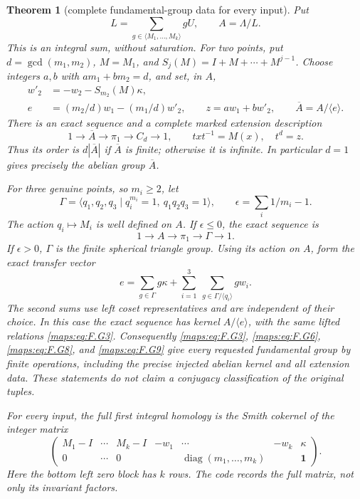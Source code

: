 \documentclass[11pt,a4paper]{article}
\newtheorem{theorem}{Theorem}[section]
\theoremstyle{definition}
\begin{document}
\begin{theorem}[complete fundamental-group data for every input]
Put
\[
 L=\sum_{g\in\langle M_1,\ldots,M_k\rangle}gU,
 \qquad A=\Lambda/L.                                      \tag{F.G4}\label{maps:eq:F.G4}
\]
This is an integral sum, without saturation.  For two points, put
$d=\gcd(m_1,m_2)$, $M=M_1$, and
$S_j(M)=I+M+\cdots+M^{j-1}$.  Choose integers $a,b$ with
$am_1+bm_2=d$, and set, in $A$,
\[
 \begin{split}
 w'_2&=-w_2-S_{m_2}(M)\kappa,\\
 e&=(m_2/d)w_1-(m_1/d)w'_2,\qquad
 z=aw_1+bw'_2,\qquad \overline A=A/\langle e\rangle .
 \end{split}                                             \tag{F.G5}\label{maps:eq:F.G5}
\]
There is an exact sequence and a complete marked extension description
\[
 1\longrightarrow\overline A\longrightarrow\pi_1
   \longrightarrow C_d\longrightarrow1,
 \qquad txt^{-1}=M(x),\quad t^d=z.                         \tag{F.G6}\label{maps:eq:F.G6}
\]
Thus its order is $d|\overline A|$ if $\overline A$ is finite;
otherwise it is infinite.  In particular $d=1$ gives precisely
the abelian group $\overline A$.

For three genuine points, so $m_i\ge2$, let
\[
 \Gamma=\langle q_1,q_2,q_3\mid q_i^{m_i}=1,
                         \ q_1q_2q_3=1\rangle,
 \qquad \epsilon=\sum_i1/m_i-1.                           \tag{F.G7}\label{maps:eq:F.G7}
\]
The action $q_i\mapsto M_i$ is well defined on $A$.
If $\epsilon\le0$, the exact sequence is
\[
                    1\longrightarrow A\longrightarrow\pi_1
                         \longrightarrow\Gamma\longrightarrow1. 
 \tag{F.G8}\label{maps:eq:F.G8}
\]
If $\epsilon>0$, $\Gamma$ is the finite spherical triangle group.
Using its action on $A$, form the exact transfer vector
\[
 e=\sum_{g\in\Gamma}g\kappa+
       \sum_{i=1}^3\ \sum_{g\in\Gamma/\langle q_i\rangle}g w_i.
 \tag{F.G9}\label{maps:eq:F.G9}
\]
The second sums use left coset representatives and are independent
of their choice.  In this case the exact sequence has kernel
$A/\langle e\rangle$, with the same lifted relations \eqref{maps:eq:F.G3}.
Consequently \eqref{maps:eq:F.G3}, \eqref{maps:eq:F.G6}, \eqref{maps:eq:F.G8}, and \eqref{maps:eq:F.G9} give every requested
fundamental group by finite operations, including the precise
injected abelian kernel and all extension data.  These statements
do not claim a conjugacy classification of the original tuples.

For every input, the full first integral homology is the Smith
cokernel of the integer matrix
\[
 \begin{pmatrix}
 M_1-I&\cdots&M_k-I&-w_1&\cdots&-w_k&\kappa\\
 0&\cdots&0&&\operatorname{diag}(m_1,\ldots,m_k)&&\boldsymbol1
 \end{pmatrix}.                                           \tag{F.G10}\label{maps:eq:F.G10}
\]
Here the bottom left zero block has $k$ rows.  The code records
the full matrix, not only its invariant factors.

\end{theorem}
\end{document}
